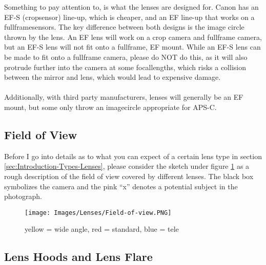 Something to pay attention to, is what the lenses are designed for. Canon has an \gls{EF-S} (\gls{cropsensor}) line-up, which is cheaper, and an \gls{EF} line-up that works on a \glspl{fullframesensor}. The key difference between both designs is the image circle thrown by the lens. An \gls{EF} lens will work on a \gls{crop} camera and \gls{fullframe} camera, but an \gls{EF-S} lens will not fit onto a \gls{fullframe}, \gls{EF} mount. While an \gls{EF-S} lens can be made to fit onto a \gls{fullframe} camera, please do NOT do this, as it will also protrude further into the camera at some \glspl{focallength}, which risks a collision between the mirror and lens, which would lead to expensive damage.
\\
\\
Additionally, with third party manufacturers, lenses will generally be an \gls{EF} mount, but some only throw an \gls{imagecircle} appropriate for \gls{APS-C}.

\subsection{Field of View}
\label{subsec:Field-of-View}

Before I go into details as to what you can expect of a certain lens type in section \ref{sec:Introduction-Types-Lenses}, please consider the sketch under figure \ref{fig:Field-of-view} as a rough description of the field of view covered by different lenses. The black box symbolizes the camera and the pink ``x'' denotes a potential subject in the photograph.

\begin{figure}[htb]
	\centering
		\texttt{[image: Images/Lenses/Field-of-view.PNG]}
	\caption{yellow = wide angle, red = standard, blue = tele}
	\label{fig:Field-of-view}
\end{figure}


\subsection{Lens Hoods and Lens Flare}

